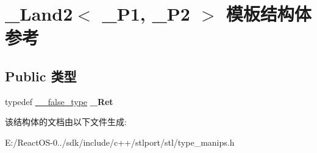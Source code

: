 \hypertarget{struct___land2}{}\section{\+\_\+\+Land2$<$ \+\_\+\+P1, \+\_\+\+P2 $>$ 模板结构体 参考}
\label{struct___land2}
\subsection*{Public 类型}
\begin{DoxyCompactItemize}
\item 
\mbox{\label{struct___land2_a5307a7eb236f5af3eab4aefdcedfb19d}} 
typedef \hyperlink{struct____false__type}{\+\_\+\+\_\+false\+\_\+type} {\bfseries \+\_\+\+Ret}
\end{DoxyCompactItemize}


该结构体的文档由以下文件生成\+:\begin{DoxyCompactItemize}
\item 
E\+:/\+React\+O\+S-\/0../sdk/include/c++/stlport/stl/type\+\_\+manips.\+h\end{DoxyCompactItemize}
